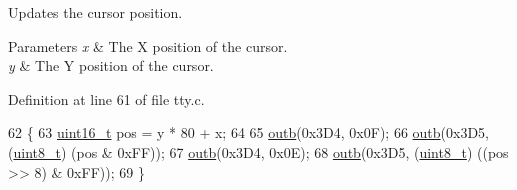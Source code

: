 Updates the cursor position. 


\begin{DoxyParams}{Parameters}
{\em x} & The X position of the cursor. \\
\hline
{\em y} & The Y position of the cursor. \\
\hline
\end{DoxyParams}


Definition at line 61 of file tty.\+c.


\begin{DoxyCode}
62 \{
63     \hyperlink{a00134_a273cf69d639a59973b6019625df33e30_a273cf69d639a59973b6019625df33e30}{uint16\_t} pos = y * 80 + x;
64  
65     \hyperlink{a00158_aa37f5841c54156a4b14fc0d6f626b44f_aa37f5841c54156a4b14fc0d6f626b44f}{outb}(0x3D4, 0x0F);
66     \hyperlink{a00158_aa37f5841c54156a4b14fc0d6f626b44f_aa37f5841c54156a4b14fc0d6f626b44f}{outb}(0x3D5, (\hyperlink{a00134_aba7bc1797add20fe3efdf37ced1182c5_aba7bc1797add20fe3efdf37ced1182c5}{uint8\_t}) (pos & 0xFF));
67     \hyperlink{a00158_aa37f5841c54156a4b14fc0d6f626b44f_aa37f5841c54156a4b14fc0d6f626b44f}{outb}(0x3D4, 0x0E);
68     \hyperlink{a00158_aa37f5841c54156a4b14fc0d6f626b44f_aa37f5841c54156a4b14fc0d6f626b44f}{outb}(0x3D5, (\hyperlink{a00134_aba7bc1797add20fe3efdf37ced1182c5_aba7bc1797add20fe3efdf37ced1182c5}{uint8\_t}) ((pos >> 8) & 0xFF));
69 \}
\end{DoxyCode}
